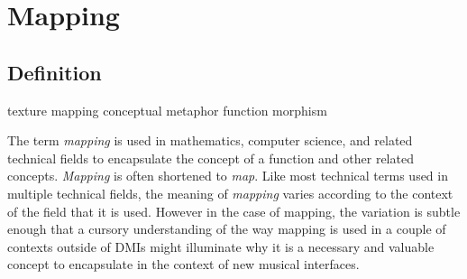 \resetdatestamp

\newcommand\Dfrac[2]{\frac{\displaystyle #1}{\displaystyle #2}}
\newcommand{\mathBF}[1]{\mbox{\boldmath $#1$}}
\newcommand{\C}[1]{\mathBF{#1}}

\chapter{Mapping}

\begin{comment}
\TeX{} does a marvelous job of setting mathematical formulas, most often
 choosing pleasing spacing.
However, on occasion one should intercede to improve the layout.
This chapter defines a few such occasions.
In addition, this chapter documents some features of the {\tt amsmath}
 package which overcome difficulties in typesetting some mathematical
 forms.
The {\tt amsmath} package is documented 
 in {\it The \LaTeX{} Companion} \cite{Goossens:1997}.

The modified setup is typeset as
\begin{equation}
  G(z) = \begin{cases}
           \Dfrac {P(z)}{1+z^{-1}} & \text{for $p$ even}, \\[1ex]
           P(z)                    & \text{for $p$ odd}.
         \end{cases}
\end{equation}

With the modified definitions, we get the following.
\def\hC#1{\C{\hat{#1}}\vphantom{\C{#1}}}           %
\def\htC#1{\C{\hat{\tilde{#1}}}\vphantom{\C{#1}}}  %
\def\tC#1{\C{\tilde{#1}}\vphantom{\C{#1}}}         %
\begin{equation}
\begin{split}
  \C{d}^{(i)} &= \hC{v}^{(i)} - \htC{v}^{(i)} \\
  \C{n}^{(i)} &= \C{u}^{(i)} - \tC{v}^{(i)}
\end{split}
\end{equation}
\end{comment}

\section{Definition}

texture mapping
conceptual metaphor
function
morphism

The term \emph{mapping} is used in mathematics, computer science, and related technical fields to encapsulate the concept of a function and other related concepts. \emph{Mapping} is often shortened to \emph{map}. Like most technical terms used in multiple technical fields, the meaning of \emph{mapping} varies according to the context of the field that it is used. However in the case of mapping, the variation is subtle enough that a cursory understanding of the way mapping is used in a couple of contexts outside of DMIs might illuminate why it is a necessary and valuable concept to encapsulate in the context of new musical interfaces.

